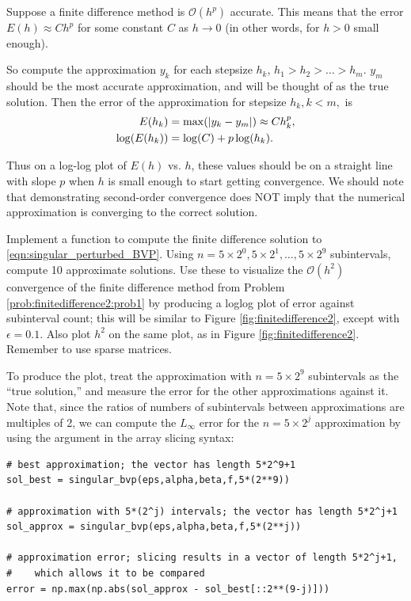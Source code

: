 Suppose a finite difference method is $\mathcal{O}(h^p)$ accurate.
This means that the error $E(h) \approx Ch^p$ for some constant $C$ as $h \to 0$ (in other words, for $h>0$ small enough).

So compute the approximation $y_k$ for each stepsize $h_k$, $h_1 > h_2> \ldots>h_m$.
$y_m$ should be the most accurate approximation, and will be thought of as the true solution.
Then the error of the approximation for
stepsize $h_k, k < m,$ is
\begin{align*}
	E(h_k) &= \max( \left\lvert y_k - y_m\right\rvert) \approx C h_k^p ,\\
	\log(E(h_k)) &= \log(C) + p \log(h_k).
\end{align*}

Thus on a log-log plot of $E(h)$ vs. $h$, these values should be on a straight line with slope $p$ when $h$ is small enough to start getting convergence.
We should note that demonstrating second-order convergence does NOT imply that the numerical approximation is converging to the correct solution.


\begin{problem}
Implement a function  to compute the finite difference solution to \eqref{eqn:singular_perturbed_BVP}.
Using $n = 5 \times 2^0,5 \times 2^1, \dots ,5 \times 2^9$ subintervals, compute 10 approximate solutions. 
Use these to visualize the $\mathcal{O}(h^2)$ convergence of the finite difference method from Problem \ref{prob:finitedifference2:prob1} by producing a loglog plot of error against subinterval count; this will be similar to Figure \ref{fig:finitedifference2}, except with $\epsilon=0.1$.
Also plot $h^2$ on the same plot, as in Figure \ref{fig:finitedifference2}.
Remember to use sparse matrices.

To produce the plot, treat the approximation with $n = 5 \times 2^9$ subintervals as the ``true solution,'' and measure the error for the other approximations against it.
Note that, since the ratios of numbers of subintervals between approximations are multiples of 2, we can compute the $L_{\infty}$ error for the $n=5 \times 2^j$ approximation by using the  argument in the array slicing syntax:
\begin{lstlisting}
# best approximation; the vector has length 5*2^9+1
sol_best = singular_bvp(eps,alpha,beta,f,5*(2**9))

# approximation with 5*(2^j) intervals; the vector has length 5*2^j+1
sol_approx = singular_bvp(eps,alpha,beta,f,5*(2**j))

# approximation error; slicing results in a vector of length 5*2^j+1,
#    which allows it to be compared
error = np.max(np.abs(sol_approx - sol_best[::2**(9-j)]))
\end{lstlisting}
\end{problem}


